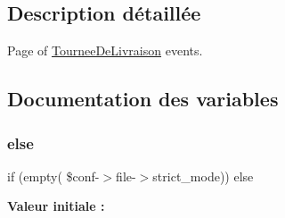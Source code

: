 \subsection{Description détaillée}
Page of \hyperlink{classTourneeDeLivraison}{Tournee\+De\+Livraison} events. 



\subsection{Documentation des variables}
\mbox{\label{tourneedelivraison__agenda_8php_aff326962ca0f1945836a0c4ca5f0be08}} 
\subsubsection{\texorpdfstring{else}{else}}
{\footnotesize\ttfamily if (empty( \$conf-\/$>$file-\/$>$strict\+\_\+mode)) else}

{\bfseries Valeur initiale \+:}
